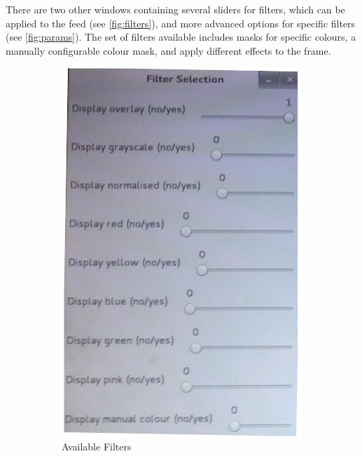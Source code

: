 There are two other windows containing several sliders for filters, which can be applied to the feed (see \autoref{fig:filters}), and more advanced options for specific filters (see \autoref{fig:params}). The set of filters available includes masks for specific colours, a manually configurable colour mask, and apply different effects to the frame.


\begin{figure}[H]
\centering
\begin{subfigure}{.5\textwidth}
\centering
\includegraphics[scale=0.2]{vision_filters}
\caption{Available Filters}
\label{fig:filters}
\end{subfigure}%
\begin{subfigure}{.5\textwidth}
\centering

\end{subfigure}
\end{figure}
